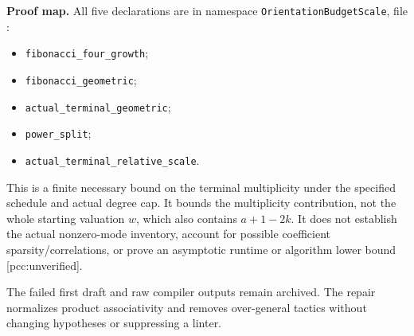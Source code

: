 \documentclass[10pt]{article}
\begin{document}
\textbf{Proof map.} All five declarations are in namespace
\texttt{OrientationBudgetScale}, file
:
\begin{itemize}
\item \texttt{fibonacci\_four\_growth};
\item \texttt{fibonacci\_geometric};
\item \texttt{actual\_terminal\_geometric};
\item \texttt{power\_split};
\item \texttt{actual\_terminal\_relative\_scale}.
\end{itemize}
This is a finite necessary bound on the terminal multiplicity under the
specified schedule and actual degree cap. It bounds the multiplicity
contribution, not the whole starting valuation $w$, which also contains
$a+1-2k$. It does not establish the actual nonzero-mode inventory, account
for possible coefficient sparsity/correlations, or prove an asymptotic
runtime or algorithm lower bound [pcc:unverified].

The failed first draft and raw compiler outputs remain archived. The repair
normalizes product associativity and removes over-general tactics without
changing hypotheses or suppressing a linter.
\end{document}
